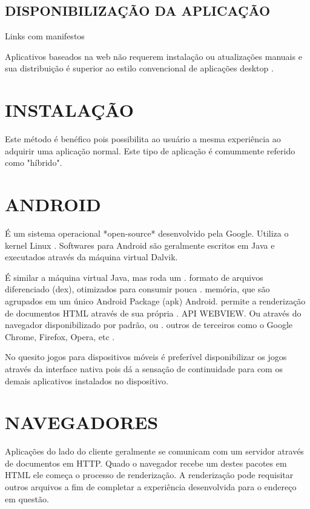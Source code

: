 \documentclass[
12pt,
a4paper,
portuges,
draft
]{report}
\begin{document}
\subsection{DISPONIBILIZAÇÃO DA APLICAÇÃO}

Links com manifestos

Aplicativos baseados na web não requerem instalação ou atualizações manuais e sua distribuição é superior ao estilo convencional de aplicações desktop \autocite{browserGamesTechnologyAndFuture}.

\section{INSTALAÇÃO}

Este método é benéfico pois possibilita ao usuário a mesma
experiência ao adquirir uma aplicação normal. Este tipo de
aplicação é comummente referido como "híbrido".

\section{ANDROID}

É um sistema operacional *open-source* desenvolvido pela Google.
Utiliza o kernel Linux .
Softwares para Android são geralmente escritos em Java e executados
através da máquina virtual Dalvik.

É similar a máquina virtual Java, mas roda um  .
formato de arquivos diferenciado (dex), otimizados para consumir pouca .
memória, que são agrupados em um único Android Package (apk) Android.
permite a renderização de documentos HTML através de sua própria   .
API WEBVIEW. Ou através do navegador disponibilizado por padrão, ou  .
outros de terceiros como o Google Chrome, Firefox, Opera, etc          .

No quesito jogos para dispositivos móveis é preferível disponibilizar
os jogos através da interface nativa pois dá a sensação de
continuidade para com os demais aplicativos instalados no dispositivo.


\section{NAVEGADORES}

Aplicações do lado do cliente geralmente se comunicam com um
servidor através de documentos em HTTP. Quado o navegador recebe um
destes pacotes em HTML ele começa o processo de renderização. A
renderização pode requisitar outros arquivos a fim de completar a
experiência desenvolvida para o endereço em questão.
\end{document}
